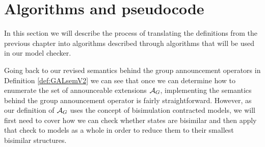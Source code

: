 \section{Algorithms and pseudocode}\label{sec:algorithms}

In this section we will describe the process of translating the definitions from the previous chapter into algorithms described through algorithms that will be used in our model checker. 


Going back to our revised semantics behind the group announcement operators in Definition \ref{def:GALsemV2} we can see that once we can determine how to enumerate the set of announceable extensions $\mathcal{A}_{G}$, implementing the semantics behind the group announcement operator is fairly straightforward. However, as our definition of $\mathcal{A}_{G}$ uses the concept of bisimulation contracted models, we will first need to cover how we can check whether states are bisimilar and then apply that check to models as a whole in order to reduce them to their smallest bisimilar structures. 


